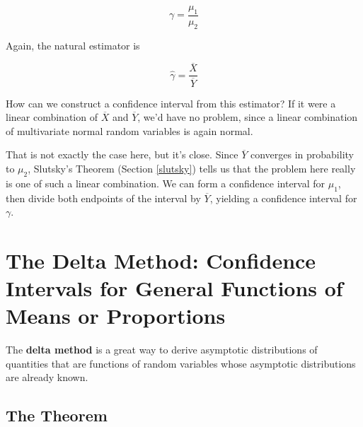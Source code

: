 \begin{equation}
\gamma = \frac{\mu_1}{\mu_2}
\end{equation}

Again, the natural estimator is

\begin{equation}
\widehat{\gamma} = \frac{\overline{X}}{\overline{Y}}
\end{equation}

How can we construct a confidence interval from this estimator?  If it
were a linear combination of $\overline{X}$ and $\overline{Y}$, we'd
have no problem, since a linear combination of multivariate normal
random variables is again normal.

That is not exactly the case here, but it's close.  Since $\overline{Y}$
converges in probability to $\mu_2$, Slutsky's Theorem (Section
\ref{slutsky}) tells us that the problem here really is one of such a
linear combination.  We can form a confidence interval for $\mu_1$, then
divide both endpoints of the interval by $\overline{Y}$, yielding a
confidence interval for $\gamma$.

\section{The Delta Method:  Confidence Intervals for General
Functions of Means or Proportions}
\label{delta}

The {\bf delta method} is a great way to derive asymptotic distributions
of quantities that are functions of random variables whose asymptotic
distributions are already known.

\subsection{The Theorem}

